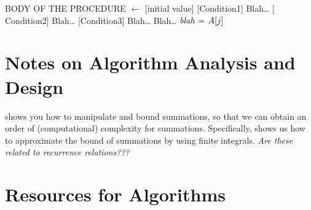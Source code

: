 \begin{codebox}
\label{lst:MyAlgorithm}
\zi {}
\zi {}
\li BODY OF THE PROCEDURE
\zi {}
\li \While [condition]
	\Do
\li	[Something]
	\End
\zi {}
\li \For {} $\gets$ [initial value] 
	\Do
\li	[Something]
	\End
\zi {}
\li	\If $[$Condition1$]$
	\Then
\li		Blah\dots
\li	\ElseIf $[$Condition2$]$
	\Then
\li		Blah\dots
\li	\ElseIf $[$Condition3$]$
	\Then
\li		Blah\dots
\li	\Else
\li		Blah\dots	
	\End
\zi {}
\li $\id{blah} \gets A[j]$
\zi	\>	
\zi	{}
\li	\Return
\end{codebox}








\section{Notes on Algorithm Analysis and Design}
\label{sec:NotesOnAlgorithmAnalysisAndDesign}

\cite[\S A.2]{Cormen2009} shows you how to manipulate and bound summations, so that we can obtain an order of (computational) complexity for summations. Specifically, \cite[\S A.2, pp. 1154--1156]{Cormen2009} shows us how to approximate the bound of summations by using finite integrals. {\it Are these related to recurrence relations???}






\section{Resources for Algorithms}
\label{sec:ResourcesForAlgorithms}

